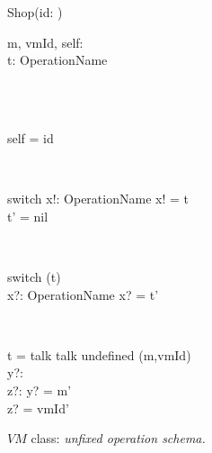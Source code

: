 \begin{figure}[H]
\centering
\begin{class}{Shop(id: \integer)}
\\
\begin{state}
m, vmId, self: \integer
\\t: OperationName
\end{state} 
\\
\begin{init}
\\self = id
\end{init} 
\\
\begin{op}{switch}
x!: OperationName
\ST
x! = t
\\t' = nil
\end{op}
\\
\begin{op}{switch}
\Delta (t)
\\x?: OperationName
\ST
x? = t'
\end{op}
\\
\begin{op}{ t = talk  talk  undefined}
\Delta (m,vmId)
\\y?: \integer
\\z?: \integer
\ST
y? = m'
\\z? = vmId'
\end{op}
\end{class}
\caption{$VM$ class: \textit{unfixed operation schema.}}
\label{fig_oz_unfixed_operation_schema_shop}
\end{figure}